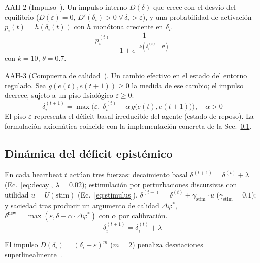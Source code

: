 \documentclass{llncs}
\begin{document}
\noindent\textsc{AAH-2} (Impulso~\parencite{sterling1988allostasis}).
Un impulso interno $D(\delta)$ que crece con el desv\'io del equilibrio
($D(\varepsilon)=0$, $D'(\delta_i)>0\;\forall\,\delta_i>\varepsilon$),
y una probabilidad de activaci\'on $p_i(t)=h(\delta_i(t))$ con $h$
mon\'otona creciente en $\delta_i$.
\begin{equation}
    p_i^{(t)} = \frac{1}{1 + e^{-k(\delta_i^{(t)} - \theta)}}
    \label{eq:sigmoid}
\end{equation}
con $k{=}10$, $\theta{=}0.7$.

\noindent\textsc{AAH-3} (Compuerta de calidad~\parencite{ryan2001happiness}).
Un cambio efectivo en el estado del entorno regulado. Sea
$g(e(t),e(t{+}1))\geq 0$ la medida de ese cambio; el impulso decrece,
sujeto a un piso fisiol\'ogico $\varepsilon \geq 0$:
\begin{equation}
    \delta_i^{(t+1)} = \max\!\bigl(\varepsilon,\; \delta_i^{(t)} - \alpha\, g\!\bigl(e(t), e(t{+}1)\bigr)\bigr),
    \quad \alpha > 0
    \label{eq:a3}
\end{equation}
El piso $\varepsilon$ representa el d\'eficit basal irreducible del agente
(estado de reposo). La formulaci\'on axiom\'atica coincide con la
implementaci\'on concreta de la Sec.~\ref{sec:deficit-dynamics}.

\subsection{Din\'amica del d\'eficit epist\'emico}
\label{sec:deficit-dynamics}

En cada heartbeat $t$ act\'uan tres fuerzas: decaimiento basal
$\delta^{(t+1)}=\delta^{(t)}+\lambda$ (Ec.~\ref{eq:decay},
$\lambda{=}0.02$); estimulaci\'on por perturbaciones discursivas con
utilidad $u\!=\!U(\text{stim})$ (Ec.~\ref{eq:stimulus}),
$\delta^{(t+)} = \delta^{(t)} + \gamma_{\text{stim}}\cdot u$
($\gamma_{\text{stim}}{=}0.1$); y saciedad tras producir un argumento
de calidad $\Delta\varphi^*$,
$\delta^{\text{new}} = \max(\varepsilon, \delta - \alpha\cdot\Delta\varphi^*)$
con $\alpha$ por calibraci\'on.
\begin{equation}
    \delta_i^{(t+1)} = \delta_i^{(t)} + \lambda
    \label{eq:decay}
\end{equation}

El impulso $D(\delta_i)=(\delta_i-\varepsilon)^m$ ($m{=}2$) penaliza
desviaciones superlinealmente~\parencite{keramati2014homeostatic}.
\end{document}
